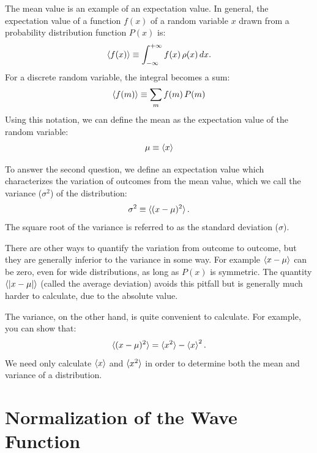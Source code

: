 \documentclass[12pt]{book}
\begin{document}
The mean value is an example of an expectation value.  In general, the
expectation value of a function $f(x)$ of a random variable $x$ drawn
from a probability distribution function $P(x)$ is:
\begin{displaymath}
\braket{f(x)} \equiv \int_{-\infty}^{+\infty} f(x) \, \rho(x) \,dx.
\end{displaymath}
For a discrete random variable, the integral becomes a sum:
\begin{displaymath}
\braket{f(m)} \equiv \sum_m f(m) \, P(m) 
\end{displaymath}
Using this notation, we can define the mean as the expectation value of the random variable:
\begin{displaymath}
\mu \equiv \braket{x}
\end{displaymath}

To answer the second question, we define an expectation value
which characterizes the variation of outcomes from the mean value,
which we call the variance ($\sigma^2$) of the distribution:
\begin{displaymath}
\sigma^2 \equiv \braket{(x-\mu)^2}.
\end{displaymath}
The square root of the variance is referred to as the
standard deviation ($\sigma$).

There are other ways to quantify the variation from outcome to
outcome, but they are generally inferior to the variance in some way.
For example $\braket{x-\mu}$ can be zero, even for wide distributions,
as long as $P(x)$ is symmetric.  The quantity $\braket{|x-\mu|}$
(called the average deviation) avoids this pitfall but is generally
much harder to calculate, due to the absolute value.

The variance, on the other hand, is quite convenient to calculate.
For example, you can show that:
\begin{equation}
\label{eqn:varhw}
\braket{(x-\mu)^2} = \braket{x^2} -\braket{x}^2.
\end{equation}
We need only calculate $\braket{x}$ and $\braket{x^2}$ in order
to determine both the mean and variance of a distribution.

\section{Normalization of the Wave Function}
\end{document}
